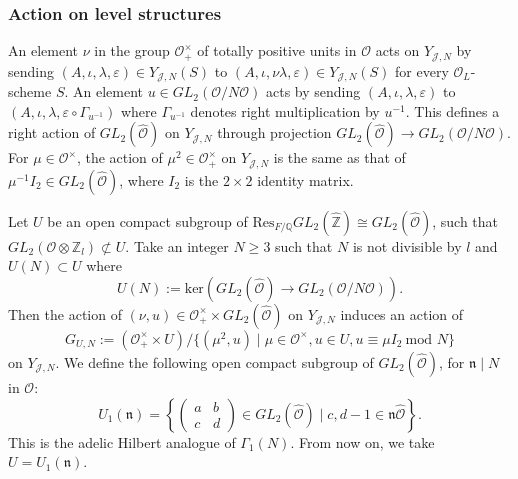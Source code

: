 \documentclass[a4paper,oneside]{amsart}
\theoremstyle{plain}
\theoremstyle{definition}
\begin{document}
\subsubsection{Action on level structures}
An element $\nu$ in the group $\mathcal{O}_+^{\times}$ of totally positive units in $\mathcal{O}$ acts on $Y_{\mathcal{J},N}$ by sending $(A, \iota, \lambda, \varepsilon) \in Y_{\mathcal{J},N}(S)$ to $(A,\iota, \nu\lambda, \varepsilon) \in Y_{\mathcal{J},N}(S)$ for every $\mathcal{O}_L$-scheme $S$. An element $u \in GL_2(\mathcal{O}/N\mathcal{O})$ acts by sending $(A, \iota, \lambda, \varepsilon)$ to $(A, \iota, \lambda, \varepsilon\circ\Gamma_{u^{-1}})$ where $\Gamma_{u^{-1}}$ denotes right multiplication by $u^{-1}$. This defines a right action of $GL_2(\hat{\mathcal{O}})$ on $Y_{\mathcal{J},N}$ through projection $GL_2(\hat{\mathcal{O}}) \rightarrow GL_2(\mathcal{O}/N\mathcal{O})$. For $\mu \in \mathcal{O}^\times$, the action of $\mu^2 \in \mathcal{O}^\times_+$ on $Y_{\mathcal{J},N}$ is the same as that of $\mu^{-1}I_2 \in GL_2(\hat{\mathcal{O}})$, where $I_2$ is the $2 \times 2$ identity matrix.

Let $U$ be an open compact subgroup of $\text{Res}_{F/ \mathbb{Q}}GL_2(\hat{\mathbb{Z}})\cong GL_2(\hat{\mathcal{O}})$, such that $GL_2(\mathcal{O} \otimes \mathbb{Z}_l) \not\subset U$. Take an integer $N \geq 3$ such that $N$ is not divisible by $l$ and $U(N) \subset U$ where 
\begin{equation*}
    U(N):= \text{ker}(GL_2(\hat{\mathcal{O}}) \rightarrow GL_2(\mathcal{O}/N\mathcal{O})).
\end{equation*}
Then the action of $(\nu,u) \in \mathcal{O}_+^\times \times GL_2(\hat{\mathcal{O}})$ on $Y_{\mathcal{J},N}$ induces an action of 
\begin{equation*}
    G_{U,N}:= (\mathcal{O}_+^\times \times U)  / \{(\mu^2, u) \mid \mu \in \mathcal{O}^\times, u \in U, u \equiv \mu I_2 \ \text{mod } N\}
\end{equation*}
on $Y_{\mathcal{J},N}$. We define the following open compact subgroup of $GL_2(\hat{\mathcal{O}})$, for $\mathfrak{n} \mid N$ in $\mathcal{O}$:
\begin{equation*}
    U_1(\mathfrak{n}) = \left\{ \left( \begin{smallmatrix}
        a & b \\ c & d
    \end{smallmatrix} \right) \in GL_2(\hat{\mathcal{O}}) \mid c, d-1 \in \mathfrak{n} \hat{\mathcal{O}} \right\}.
\end{equation*}
This is the adelic Hilbert analogue of $\Gamma_1(N)$. From now on, we take $U = U_1(\mathfrak{n})$.
\end{document}
